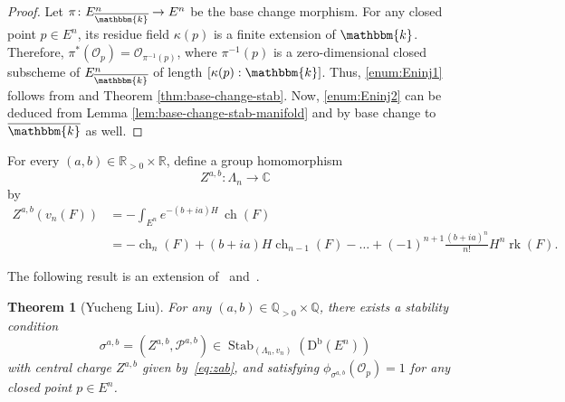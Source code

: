 \documentclass[11pt, reqno]{amsart}
\numberwithin{equation}{section}
\theoremstyle{plain}
\newtheorem{theorem}{Theorem}[section]
\theoremstyle{remark}
\theoremstyle{definition}
\theoremstyle{italicsname}
\newcommand{\Db}{\mathrm{D^b}}
\DeclareMathOperator{\Stab}{Stab}
\DeclareMathOperator{\ch}{{ch}}
\DeclareMathOperator{\rk}{{rk}}
\newcommand{\cO}{\mathcal{O}}
\newcommand{\cP}{\mathscr{P}}
\newcommand{\KK}{\mathbbm{k}}
\def\CC{\ensuremath{\mathbb{C}}}
\def\QQ{\ensuremath{\mathbb{Q}}}
\def\RR{\ensuremath{\mathbb{R}}}
\begin{document}
\begin{proof}
Let $\pi\colon E^n_{\overline{\KK}}\to E^n$ be the base change morphism. For any closed point $p\in E^n$, its residue field $\kappa(p)$ is a finite extension of $\KK$. Therefore, $\pi^*(\cO_p)=\cO_{\pi^{-1}(p)}$, where $\pi^{-1}(p)$ is a zero-dimensional closed subscheme of $E^n_{\overline{\KK}}$ of length $[\kappa(p):\KK]$. Thus, \ref{enum:Eninj1} follows from \cite[Theorem~1.1, Proposition~2.9]{FLZ:Albanese} and Theorem \ref{thm:base-change-stab}. Now, \ref{enum:Eninj2} can be deduced from Lemma \ref{lem:base-change-stab-manifold} and \cite[Theorem~1.1]{curves} by base change to $\overline{\KK}$ as well.
\end{proof}

For every $(a,b)\in \RR_{>0}\times \RR$, define a group homomorphism
\[
Z^{a,b}\colon \Lambda_n\longrightarrow \CC
\]
by
\begin{equation}\label{eq:zab}
\begin{split}
Z^{a,b}(v_n(F))
&= -\int_{E^n} e^{-(b+ia)H}\,\ch(F) \\
&= -\ch_n(F)
+(b+ia)H\ch_{n-1}(F)
-\dots
+(-1)^{n+1}\frac{(b+ia)^n}{n!}H^n\rk(F).
\end{split}    
\end{equation}

The following result is an extension of~\cite[Theorem~5.9]{Liu:StabProd} and~\cite[Theorem~4.5]{curves}.

\begin{theorem}[Yucheng Liu]\label{thm:Yucheng}
For any $(a,b)\in \QQ_{>0}\times \QQ$, there exists a stability condition
\[
\sigma^{a,b}=(Z^{a,b},\cP^{a,b})\in\Stab_{(\Lambda_n,v_n)}(\Db(E^n))
\]
with central charge $Z^{a,b}$ given by~\eqref{eq:zab}, and satisfying
$\phi_{\sigma^{a,b}}(\cO_p)=1$ for any closed point $p\in E^n$. 
\end{theorem}
\end{document}
